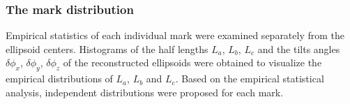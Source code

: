 \documentclass[journal]{IEEEtran}
\begin{document}
\subsubsection{The mark distribution}
\label{sec:mark-distribution}

Empirical statistics of each individual mark were examined separately
from the ellipsoid centers. Histograms of the half lengths $L_a$,
$L_b$, $L_c$ and the tilts angles $\delta\phi_x$, $\delta\phi_y$,
$\delta\phi_z$ of the reconstructed ellipsoids were obtained to
visualize the empirical distributions of $L_a$, $L_b$ and $L_c$. Based
on the empirical statistical analysis, independent distributions were
proposed for each mark.


\end{document}
